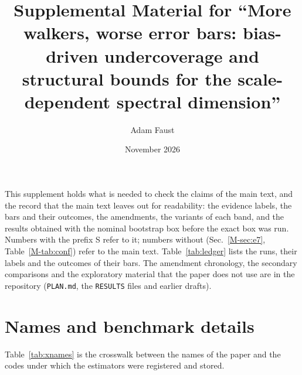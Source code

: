 \documentclass[aps,pre,twocolumn,superscriptaddress,nofootinbib,10pt]{revtex4-2}
\begin{document}
\title{Supplemental Material for ``More walkers, worse error bars: bias-driven undercoverage and structural bounds for the scale-dependent spectral dimension''}

\author{Adam Faust}
\date{November 2026}

\maketitle

This supplement holds what is needed to check the claims of the main text, and the record that the main text leaves out for readability: the evidence labels, the bars and their outcomes, the amendments, the variants of each band, and the results obtained with the nominal bootstrap box before the exact box was run. Numbers with the prefix S refer to it; numbers without (Sec.~\ref{M-sec:e7}, Table~\ref{M-tab:conf}) refer to the main text. Table~\ref{tab:ledger} lists the runs, their labels and the outcomes of their bars. The amendment chronology, the secondary comparisons and the exploratory material that the paper does not use are in the repository (\texttt{PLAN.md}, the \texttt{RESULTS} files and earlier drafts).

\section{Names and benchmark details}\label{sup:bench}
Table~\ref{tab:xnames} is the crosswalk between the names of the paper and the codes under which the estimators were registered and stored.
\end{document}

